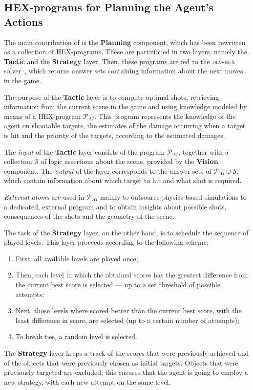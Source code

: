 \subsection{HEX-programs for Planning the Agent's Actions}

The main contribution of \ah is the \textbf{Planning} component, which has
been rewritten as a collection of HEX-programs.
These are partitioned in two layers, namely
the \textbf{Tactic} and the \textbf{Strategy} layer.
Then, these programs are fed to the
\textsc{dlv-hex} solver~\cite{dlvHEX},
which returns answer sets containing
information about the next moves in the game.

The purpose of the \textbf{Tactic} layer is to compute optimal shots, retrieving information from the current scene in the game and using knowledge modeled by means of a HEX-program \(\mathcal{P}_{AI}\).
This program represents the knowledge of the agent on shootable targets, the estimates of the damage occurring when a target is hit and the priority of the targets, according to the estimated damages.

The \emph{input} of the \textbf{Tactic} layer consists of the program \(\mathcal{P}_{AI}\), together with a collection \(\mathcal{S}\) of logic assertions about the scene, provided by the \textbf{Vision} component.
The \emph{output} of the layer corresponds to the answer sets of \(\mathcal{P}_{AI} \cup \mathcal{S}\), which contain information about which target to hit and what shot is required.

\emph{External atoms} are used in \(\mathcal{P}_{AI}\) mainly to outsource physics-based simulations to a dedicated, external program and to obtain insights about possible shots, consequences of the shots and the geometry of the scene.

The task of the \textbf{Strategy} layer, on the other hand, is to schedule the sequence of played levels. This layer proceeds according to the following scheme:
\begin{enumerate}
    \item First, all available levels are played once;
    \item Then, each level in which the obtained scores has the greatest difference from the current best score is selected --- up to a set threshold of possible attempts;
    \item Next, those levels where \ah scored better than the current best score, with the least difference in score, are selected (up to a certain number of attempts);
    \item To break ties, a random level is selected.
\end{enumerate}

The \textbf{Strategy} layer keeps a track of the scores that were previously achieved and of the objects that were previously chosen as initial targets.
Objects that were previously targeted are excluded; this ensures that the agent is going to employ a new strategy, with each new attempt on the same level.